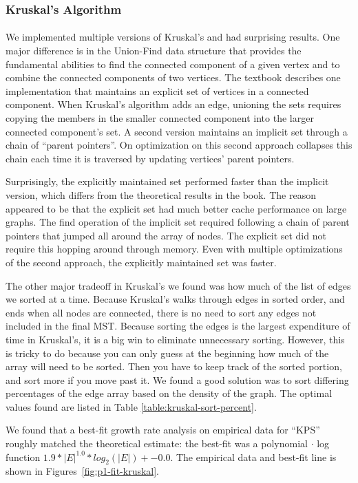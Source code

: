 \subsubsection{Kruskal's Algorithm}
\paragraph{}
We implemented multiple versions of Kruskal's and had surprising
results. One major difference is in the Union-Find data structure that
provides the fundamental abilities to find the connected component of a
given vertex and to combine the connected components of two vertices. The
textbook describes one implementation that maintains an explicit set of
vertices in a connected component. When Kruskal's algorithm adds an edge,
unioning the sets requires copying the members in the smaller connected
component into the larger connected component's set. A second version
maintains an implicit set through a chain of ``parent
pointers''. On optimization on this second approach collapses this chain
each time it is traversed by updating vertices' parent pointers.

Surprisingly, the explicitly maintained set performed faster than the
implicit version, which differs from the theoretical results in the
book. The reason appeared to
be that the explicit set had much better cache performance on large
graphs. The find operation of the
implicit set required following a chain of parent pointers that jumped
all around the array of nodes. The explicit set did not require this
hopping around through memory. Even with multiple optimizations of the
second approach, the explicitly maintained set was faster.

The other major tradeoff in Kruskal's we found was how much of the list of
edges we sorted at a time. Because Kruskal's walks through edges in sorted
order, and ends when all nodes are connected, there is no need to sort any
edges not included in the final MST. Because sorting the edges is the
largest expenditure of time in Kruskal's, it is a big win to eliminate
unnecessary sorting. However, this is tricky to do because you can only
guess at the beginning how much of the array will need to be sorted. Then
you have to keep track of the sorted portion, and sort more if you move
past it. We found a good solution was to sort differing percentages of the
edge array based on the density of the graph. The optimal values found are
listed in Table \ref{table:kruskal-sort-percent}.

We found that a best-fit growth rate analysis on empirical data for ``KPS''
roughly matched the theoretical estimate: the best-fit was a polynomial $\cdot$
log function $1.9 * |E|^{1.0} * log_2(|E|) + -0.0$.  The empirical data and
best-fit line is shown in Figures~\ref{fig:p1-fit-kruskal}.

